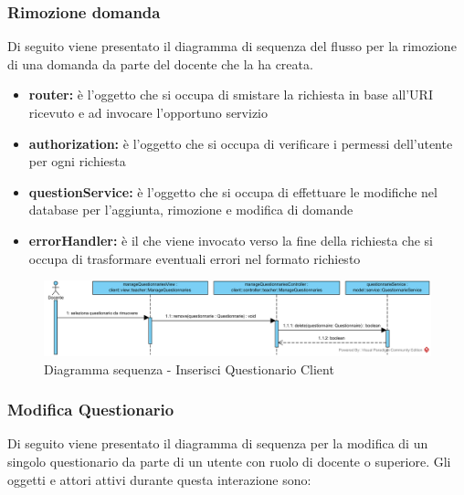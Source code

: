 \documentclass[12pt,a4paper]{article}
\begin{document}
\newpage
\subsubsection{Rimozione domanda}
Di seguito viene presentato il diagramma di sequenza del flusso per la rimozione di una domanda da parte del docente che la ha creata.

\begin{itemize}
	\item \textbf{router:} è l'oggetto che si occupa di smistare la richiesta in base all’URI ricevuto e ad invocare l’opportuno servizio
	\item \textbf{authorization:} è l'oggetto che si occupa di verificare i permessi dell'utente per ogni richiesta	
	\item \textbf{questionService:} è l'oggetto che si occupa di effettuare le modifiche nel database per l'aggiunta, rimozione e modifica di domande
	\item \textbf{errorHandler:} è il  che viene invocato verso la fine della richiesta che si occupa di trasformare eventuali errori nel formato  richiesto
\end{itemize}

\begin{center}
	\begin{figure}[H]
		\centering \includegraphics[max width=\myheight, angle=90]{../img/diagrammiSequenza/rimozioneQuestionarioClient.png}
		\caption{Diagramma sequenza - Inserisci Questionario Client}
	\end{figure}
\end{center}

\newpage
\subsubsection{Modifica Questionario}
Di seguito viene presentato il diagramma di sequenza per la modifica di un singolo questionario da parte di un utente con ruolo di docente o superiore. Gli oggetti e attori attivi durante questa interazione sono:
\end{document}
